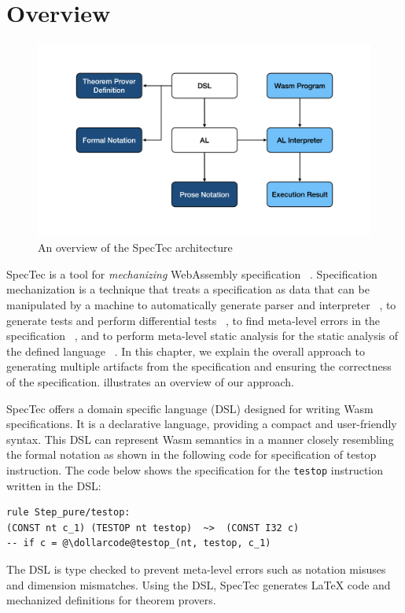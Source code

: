 
\chapter{Overview}
\label{ch:overview}
\noindent


\begin{figure}[t]
  \centerline{\includegraphics[width=15cm]{fig/overview}}
  \caption[An overview of the SpecTec architecture]
    {An overview of the SpecTec architecture}
    \label{fig:overview}
\end{figure}

SpecTec is a tool for \textit{mechanizing} WebAssembly specification
~\cite{spectec}.
Specification mechanization is a technique that treats a specification as data
that can be manipulated by a machine to automatically generate parser and
interpreter ~\cite{jiset}, to generate tests and perform differential tests
~\cite{jest}, to find meta-level errors in the specification ~\cite{jstar}, and
to perform meta-level static analysis for the static analysis of the defined
language ~\cite{jsaver}.
In this chapter, we explain the overall approach to generating multiple
artifacts from the specification and ensuring the correctness of the
specification.
 illustrates an overview of our approach.


SpecTec offers a domain specific language (DSL) designed for writing
Wasm specifications.
It is a declarative language, providing a compact and user-friendly syntax.
This DSL can represent Wasm semantics in a manner closely resembling the formal
notation as shown in the following code for specification of testop
instruction.
The code below shows the specification for the \texttt{testop} instruction
written in the DSL:
\begin{lstlisting}[style=dsl]
rule Step_pure/testop:
(CONST nt c_1) (TESTOP nt testop)  ~>  (CONST I32 c)
-- if c = @\dollarcode@testop_(nt, testop, c_1)
\end{lstlisting}
The DSL is type checked to prevent meta-level errors such as notation misuses
and dimension mismatches.
Using the DSL, SpecTec generates LaTeX code and mechanized definitions for
theorem provers.



